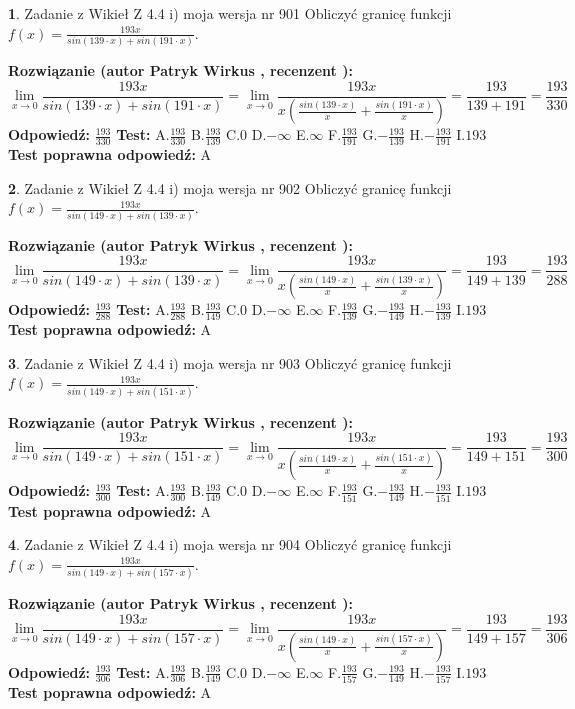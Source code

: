 \documentclass[12pt, a4paper]{article}
\theoremstyle{definition} %
\newtheorem{zad}{}
\newcommand{\zadStart}[1]{\begin{zad}#1\newline}
\newcommand{\zadStop}{\end{zad}}
\newcommand{\rozwStart}[2]{\noindent \textbf{Rozwiązanie (autor #1 , recenzent #2): }\newline}
\newcommand{\rozwStop}{\newline}
\newcommand{\odpStart}{\noindent \textbf{Odpowiedź:}\newline}
\newcommand{\odpStop}{\newline}
\newcommand{\testStart}{\noindent \textbf{Test:}\newline}
\newcommand{\testStop}{\newline}
\newcommand{\kluczStart}{\noindent \textbf{Test poprawna odpowiedź:}\newline}
\newcommand{\kluczStop}{\newline}
\begin{document}
\zadStart{Zadanie z Wikieł Z 4.4 i) moja wersja nr 901}
Obliczyć granicę funkcji $f(x)=\frac{193x}{sin(139\cdot x) +sin(191\cdot x)}$.
\zadStop
\rozwStart{Patryk Wirkus}{}
$$\lim\limits_{x\to 0}\frac{193x}{sin(139\cdot x) +sin(191\cdot x)}=\lim\limits_{x\to 0}\frac{193x}{x(\frac{sin(139\cdot x)}{x}+\frac{sin(191\cdot x)}{x})}=\frac{193}{139+191} = \frac{193}{330}$$
\rozwStop
\odpStart
$\frac{193}{330}$
\odpStop
\testStart
A.$\frac{193}{330}$
B.$\frac{193}{139}$
C.$0$
D.$-\infty$
E.$\infty$
F.$\frac{193}{191}$
G.$-\frac{193}{139}$
H.$-\frac{193}{191}$
I.$193$
\testStop
\kluczStart
A
\kluczStop



\zadStart{Zadanie z Wikieł Z 4.4 i) moja wersja nr 902}
Obliczyć granicę funkcji $f(x)=\frac{193x}{sin(149\cdot x) +sin(139\cdot x)}$.
\zadStop
\rozwStart{Patryk Wirkus}{}
$$\lim\limits_{x\to 0}\frac{193x}{sin(149\cdot x) +sin(139\cdot x)}=\lim\limits_{x\to 0}\frac{193x}{x(\frac{sin(149\cdot x)}{x}+\frac{sin(139\cdot x)}{x})}=\frac{193}{149+139} = \frac{193}{288}$$
\rozwStop
\odpStart
$\frac{193}{288}$
\odpStop
\testStart
A.$\frac{193}{288}$
B.$\frac{193}{149}$
C.$0$
D.$-\infty$
E.$\infty$
F.$\frac{193}{139}$
G.$-\frac{193}{149}$
H.$-\frac{193}{139}$
I.$193$
\testStop
\kluczStart
A
\kluczStop



\zadStart{Zadanie z Wikieł Z 4.4 i) moja wersja nr 903}
Obliczyć granicę funkcji $f(x)=\frac{193x}{sin(149\cdot x) +sin(151\cdot x)}$.
\zadStop
\rozwStart{Patryk Wirkus}{}
$$\lim\limits_{x\to 0}\frac{193x}{sin(149\cdot x) +sin(151\cdot x)}=\lim\limits_{x\to 0}\frac{193x}{x(\frac{sin(149\cdot x)}{x}+\frac{sin(151\cdot x)}{x})}=\frac{193}{149+151} = \frac{193}{300}$$
\rozwStop
\odpStart
$\frac{193}{300}$
\odpStop
\testStart
A.$\frac{193}{300}$
B.$\frac{193}{149}$
C.$0$
D.$-\infty$
E.$\infty$
F.$\frac{193}{151}$
G.$-\frac{193}{149}$
H.$-\frac{193}{151}$
I.$193$
\testStop
\kluczStart
A
\kluczStop



\zadStart{Zadanie z Wikieł Z 4.4 i) moja wersja nr 904}
Obliczyć granicę funkcji $f(x)=\frac{193x}{sin(149\cdot x) +sin(157\cdot x)}$.
\zadStop
\rozwStart{Patryk Wirkus}{}
$$\lim\limits_{x\to 0}\frac{193x}{sin(149\cdot x) +sin(157\cdot x)}=\lim\limits_{x\to 0}\frac{193x}{x(\frac{sin(149\cdot x)}{x}+\frac{sin(157\cdot x)}{x})}=\frac{193}{149+157} = \frac{193}{306}$$
\rozwStop
\odpStart
$\frac{193}{306}$
\odpStop
\testStart
A.$\frac{193}{306}$
B.$\frac{193}{149}$
C.$0$
D.$-\infty$
E.$\infty$
F.$\frac{193}{157}$
G.$-\frac{193}{149}$
H.$-\frac{193}{157}$
I.$193$
\testStop
\kluczStart
A
\kluczStop
\end{document}
